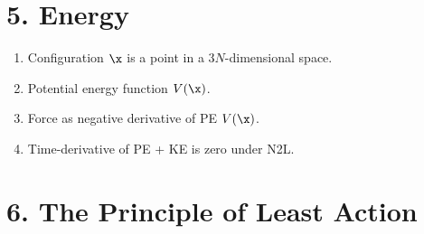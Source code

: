 
\section{5. Energy}
\begin{enumerate}
\item Configuration $\x$ is a point in a $3N$-dimensional space.
\item Potential energy function $V(\x)$.
\item Force as negative derivative of PE $V(\x)$.
\item Time-derivative of PE + KE is zero under N2L.
\end{enumerate}
\section{6. The Principle of Least Action}

